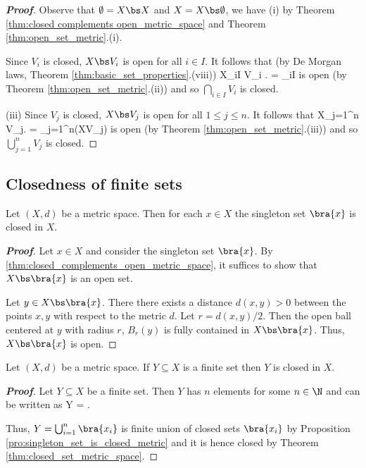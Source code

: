 \begin{proof}[\bf Proof]
\ben
\item [(i)] Observe that $\emptyset = X \bs X$ and $X=X\bs \emptyset$, we have (i) by Theorem \ref{thm:closed complements open_metric_space} and Theorem \ref{thm:open_set_metric}.(i).

\item [(ii)] Since $V_i$ is closed, $X\bs V_i$ is open for all $i \in I$. It follows that (by De Morgan laws, Theorem \ref{thm:basic_set_properties}.(viii))
\be
X\left\bs \bigcap_{i\in I} V_i \right. = \bigcup_{i\in I}
\ee
is open (by Theorem \ref{thm:open_set_metric}.(ii)) and so $\bigcap_{i\in I} V_i$ is closed.

(iii) Since $V_{j}$ is closed, $X\bs V_{j}$ is open for all $1\leq j\leq n$. It follows that
\be
X\left\bs \bigcup_{j=1}^{n} V_{j}\right. = \bigcap_{j=1}^{n}(X\bs V_{j})
\ee
is open (by Theorem \ref{thm:open_set_metric}.(iii)) and so $\bigcup_{j=1}^{n} V_{j}$ is closed.
\een
\end{proof}


\subsection{Closedness of finite sets}

\begin{proposition}\label{pro:singleton_set_is_closed_metric}
Let $(X,d)$ be a metric space. Then for each $x\in X$ the singleton set $\bra{x}$ is closed in $X$.
\end{proposition}

\begin{proof}[\bf Proof]
Let $x\in X$ and consider the singleton set $\bra{x}$. By \ref{thm:closed_complements_open_metric_space}, it suffices to show that $X\bs\bra{x}$ is an open set.

Let $y\in X\bs\bra{x}$. There there exists a distance $d(x,y)>0$ between the points $x,y$ with respect to the metric $d$. Let $r = d(x,y)/2$. Then the open ball centered at $y$ with radius $r$, $B_r(y)$ is fully contained in $X\bs \bra{x}$. Thus, $X\bs\bra{x}$ is open.
\end{proof}


\begin{proposition}
Let $(X,d)$ be a metric space. If $Y\subseteq X$ is a finite set then $Y$ is closed in $X$.
\end{proposition}

\begin{proof}[\bf Proof]
Let $Y\subseteq X$ be a finite set. Then $Y$ has $n$ elements for some $n\in \N$ and can be written as
\be
Y = .
\ee

Thus, $Y = \bigcup^n_{i=1}\bra{x_i}$ is finite union of closed sets $\bra{x_i}$ by Proposition \ref{pro:singleton_set_is_closed_metric} and it is hence closed by Theorem \ref{thm:closed_set_metric_space}.
\end{proof}



